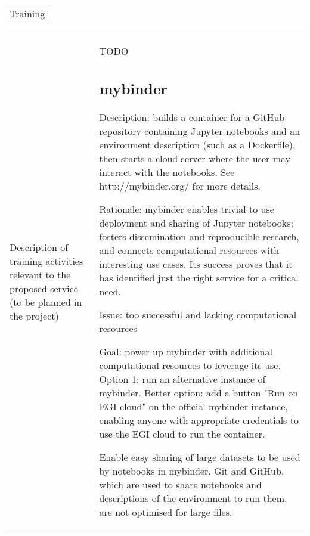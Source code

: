 \begin{tabular}{|l|}
\hline
Training
\hline
\end{tabular}
\begin{tabular}{|l|l|}
\hline
Description of training activities relevant to the proposed service (to be planned in the project)&TODO
\hline


\subsection{mybinder}

Description: builds a container for a GitHub repository containing Jupyter
notebooks and an environment description (such as a Dockerfile), then starts a
cloud server where the user may interact with the notebooks. See http://mybinder.org/
for more details.

Rationale: mybinder enables trivial to use deployment and sharing of
Jupyter notebooks; fosters dissemination and reproducible research,
and connects computational resources with interesting use cases.
Its success proves that it has identified just the right service for
a critical need.

Issue: too successful and lacking computational resources

Goal: power up mybinder with additional computational resources to
leverage its use. Option 1: run an alternative instance of mybinder.
Better option: add a button "Run on EGI cloud" on the official
mybinder instance, enabling anyone with appropriate credentials to use
the EGI cloud to run the container.

Enable easy sharing of large datasets to be used by notebooks in mybinder. Git
and GitHub, which are used to share notebooks and descriptions of the
environment to run them, are not optimised for large files.



\end{tabular}
